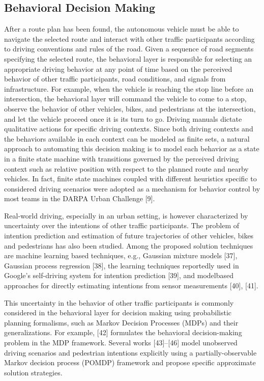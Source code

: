 \documentclass[a4paper,10pt]{article}
\begin{document}
\subsection{Behavioral Decision Making}
After a route plan has been found, the autonomous vehicle must be able to navigate the selected route and interact with other traffic participants according to driving conventions and rules of the road. Given a sequence of road segments specifying the selected route, the behavioral layer is responsible for selecting an appropriate driving behavior at any point of time based on the perceived behavior of other traffic participants, road conditions, and signals from infrastructure. For example, when the vehicle is reaching the stop line before an intersection, the behavioral layer will command the vehicle to come to a stop, observe the behavior of other vehicles, bikes, and pedestrians at the intersection, and let the vehicle proceed once it is its turn to go. Driving manuals dictate qualitative actions for specific driving contexts. Since both driving contexts and the behaviors available in each context can be modeled as finite sets, a natural approach to automating this decision making is to model each behavior as a state in a finite state machine with transitions governed by the perceived driving context such as relative position with respect to the planned route and nearby vehicles. In fact, finite state machines coupled with different heuristics specific to considered driving scenarios were adopted as a mechanism for behavior control by most teams in the DARPA Urban Challenge [9].

Real-world driving, especially in an urban setting, is however characterized by uncertainty over the intentions of other traffic participants. The problem of intention prediction and estimation of future trajectories of other vehicles, bikes and pedestrians has also been studied. Among the proposed solution techniques are machine learning based techniques, e.g., Gaussian mixture models [37], Gaussian process regression [38], the learning techniques reportedly used in Google’s self-driving system for intention prediction [39], and modelbased approaches for directly estimating intentions from sensor measurements [40], [41].

This uncertainty in the behavior of other traffic participants is commonly considered in the behavioral layer for decision making using probabilistic planning formalisms, such as Markov Decision Processes (MDPs) and their generalizations. For example, [42] formulates the behavioral decision-making problem in the MDP framework. Several works [43]–[46] model unobserved driving scenarios and pedestrian intentions explicitly using a partially-observable Markov decision process (POMDP) framework and propose specific approximate solution strategies.
\end{document}
